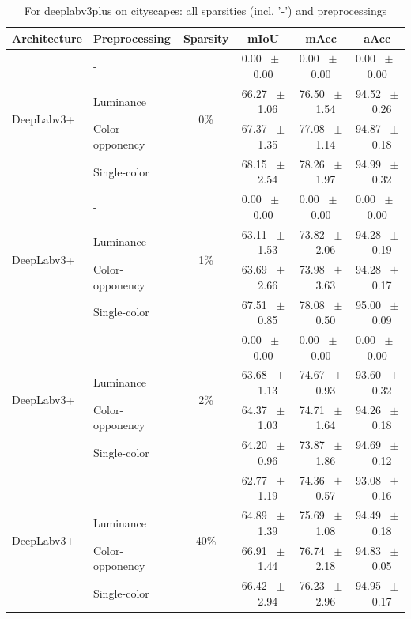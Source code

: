 \begin{table}[h]
  \centering
  \caption{For deeplabv3plus on cityscapes: all sparsities (incl. '-') and preprocessings}
  \begin{tabular}{@{}l l c c c c@{}}
    \toprule
    Architecture & Preprocessing & Sparsity & mIoU & mAcc & aAcc \\
    \midrule
    \multirow{4}{*}{DeepLabv3+} & - & \multirow{4}{*}{0\%} & 0.00 ~$\pm$~ 0.00 & 0.00 ~$\pm$~ 0.00 & 0.00 ~$\pm$~ 0.00 \\
    & Luminance &  & 66.27 ~$\pm$~ 1.06 & 76.50 ~$\pm$~ 1.54 & 94.52 ~$\pm$~ 0.26 \\
    & Color-opponency &  & 67.37 ~$\pm$~ 1.35 & 77.08 ~$\pm$~ 1.14 & 94.87 ~$\pm$~ 0.18 \\
    & Single-color &  & 68.15 ~$\pm$~ 2.54 & 78.26 ~$\pm$~ 1.97 & 94.99 ~$\pm$~ 0.32 \\
    \midrule
    \multirow{4}{*}{DeepLabv3+} & - & \multirow{4}{*}{1\%} & 0.00 ~$\pm$~ 0.00 & 0.00 ~$\pm$~ 0.00 & 0.00 ~$\pm$~ 0.00 \\
    & Luminance &  & 63.11 ~$\pm$~ 1.53 & 73.82 ~$\pm$~ 2.06 & 94.28 ~$\pm$~ 0.19 \\
    & Color-opponency &  & 63.69 ~$\pm$~ 2.66 & 73.98 ~$\pm$~ 3.63 & 94.28 ~$\pm$~ 0.17 \\
    & Single-color &  & 67.51 ~$\pm$~ 0.85 & 78.08 ~$\pm$~ 0.50 & 95.00 ~$\pm$~ 0.09 \\
    \midrule
    \multirow{4}{*}{DeepLabv3+} & - & \multirow{4}{*}{2\%} & 0.00 ~$\pm$~ 0.00 & 0.00 ~$\pm$~ 0.00 & 0.00 ~$\pm$~ 0.00 \\
    & Luminance &  & 63.68 ~$\pm$~ 1.13 & 74.67 ~$\pm$~ 0.93 & 93.60 ~$\pm$~ 0.32 \\
    & Color-opponency &  & 64.37 ~$\pm$~ 1.03 & 74.71 ~$\pm$~ 1.64 & 94.26 ~$\pm$~ 0.18 \\
    & Single-color &  & 64.20 ~$\pm$~ 0.96 & 73.87 ~$\pm$~ 1.86 & 94.69 ~$\pm$~ 0.12 \\
    \midrule
    \multirow{4}{*}{DeepLabv3+} & - & \multirow{4}{*}{40\%} & 62.77 ~$\pm$~ 1.19 & 74.36 ~$\pm$~ 0.57 & 93.08 ~$\pm$~ 0.16 \\
    & Luminance &  & 64.89 ~$\pm$~ 1.39 & 75.69 ~$\pm$~ 1.08 & 94.49 ~$\pm$~ 0.18 \\
    & Color-opponency &  & 66.91 ~$\pm$~ 1.44 & 76.74 ~$\pm$~ 2.18 & 94.83 ~$\pm$~ 0.05 \\
    & Single-color &  & 66.42 ~$\pm$~ 2.94 & 76.23 ~$\pm$~ 2.96 & 94.95 ~$\pm$~ 0.17 \\
    \midrule

\end{tabular}
\end{table}
